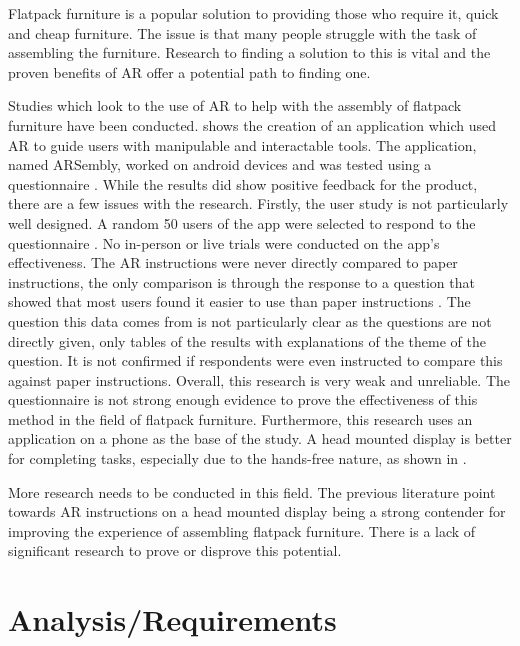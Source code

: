 \documentclass{l4proj}
\begin{document}
Flatpack furniture is a popular solution to providing those who require it, quick and cheap furniture. The issue is that many people struggle with the task of assembling the furniture. Research to finding a solution to this is vital and the proven benefits of AR offer a potential path to finding one.

Studies which look to the use of AR to help with the assembly of flatpack furniture have been conducted. \citet{hartanto_development_2019} shows the creation of an application which used AR to guide users with manipulable and interactable tools. The application, named ARSembly, worked on android devices and was tested using a questionnaire \citep{hartanto_development_2019}. While the results did show positive feedback for the product, there are a few issues with the research. Firstly, the user study is not particularly well designed. A random 50 users of the app were selected to respond to the questionnaire \citep{hartanto_development_2019}. No in-person or live trials were conducted on the app's effectiveness. The AR instructions were never directly compared to paper instructions, the only comparison is through the response to a question that showed that most users found it easier to use than paper instructions \citep{hartanto_development_2019}. The question this data comes from is not particularly clear as the questions are not directly given, only tables of the results with explanations of the theme of the question. It is not confirmed if respondents were even instructed to compare this against paper instructions. Overall, this research is very weak and unreliable. The questionnaire is not strong enough evidence to prove the effectiveness of this method in the field of flatpack furniture. Furthermore, this research uses an application on a phone as the base of the study. A head mounted display is better for completing tasks, especially due to the hands-free nature, as shown in \citep{blattgerste_comparing_2017, chen_papertoplace_2023}.

More research needs to be conducted in this field. The previous literature point towards AR instructions on a head mounted display being a strong contender for improving the experience of assembling flatpack furniture. There is a lack of significant research to prove or disprove this potential.

\chapter{Analysis/Requirements}
\label{chap:analysis}
\end{document}
